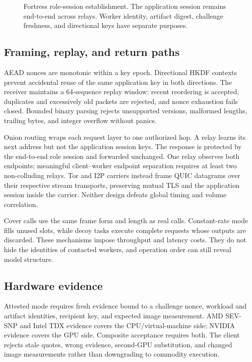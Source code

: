 \begin{figure}[htbp]
\centering

\caption{Fortress role-session establishment. The application session remains end-to-end across relays. Worker identity, artifact digest, challenge freshness, and directional keys have separate purposes.}
\label{fig:session}
\end{figure}

\subsection{Framing, replay, and return paths}

AEAD nonces are monotonic within a key epoch. Directional HKDF contexts prevent accidental reuse of the same application key in both directions. The receiver maintains a 64-sequence replay window: recent reordering is accepted, duplicates and excessively old packets are rejected, and nonce exhaustion fails closed. Bounded binary parsing rejects unsupported versions, malformed lengths, trailing bytes, and integer overflow without panics.

Onion routing wraps each request layer to one authorized hop. A relay learns its next address but not the application session keys. The response is protected by the end-to-end role session and forwarded unchanged. One relay observes both endpoints; meaningful client--worker endpoint separation requires at least two non-colluding relays. Tor and I2P carriers instead frame QUIC datagrams over their respective stream transports, preserving mutual TLS and the application session inside the carrier. Neither design defeats global timing and volume correlation.

Cover calls use the same frame form and length as real calls. Constant-rate mode fills unused slots, while decoy tasks execute complete requests whose outputs are discarded. These mechanisms impose throughput and latency costs. They do not hide the identities of contacted workers, and operation order can still reveal model structure.

\subsection{Hardware evidence}

Attested mode requires fresh evidence bound to a challenge nonce, workload and artifact identities, recipient key, and expected image measurement. AMD SEV-SNP and Intel TDX evidence covers the CPU/virtual-machine side; NVIDIA evidence covers the GPU side. Composite acceptance requires both. The client rejects stale quotes, wrong evidence, second-GPU substitution, and changed image measurements rather than downgrading to commodity execution.

